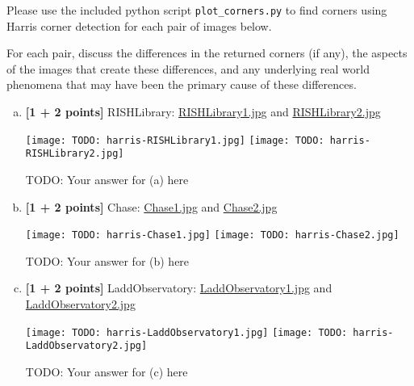 Please use the included python script \texttt{plot\_corners.py} to find corners using Harris corner detection for each pair of images below. 

For each pair, discuss the differences in the returned corners (if any), the aspects of the images that create these differences, and any underlying real world phenomena that may have been the primary cause of these differences.

\begin{enumerate}[(a)]
    \item \textbf{[1 + 2 points]}
RISHLibrary: 
\href{images/RISHLibrary1.jpg}{RISHLibrary1.jpg} and \href{images/RISHLibrary2.jpg}{RISHLibrary2.jpg} 

\texttt{[image: TODO: harris-RISHLibrary1.jpg]}
\texttt{[image: TODO: harris-RISHLibrary2.jpg]}

\begin{mdframed}
    TODO: Your answer for (a) here
\end{mdframed}

    \item \textbf{[1 + 2 points]}
Chase:
\href{images/Chase1.jpg}{Chase1.jpg} and \href{images/Chase2.jpg}{Chase2.jpg}

\texttt{[image: TODO: harris-Chase1.jpg]}
\texttt{[image: TODO: harris-Chase2.jpg]}

\begin{mdframed}
    TODO: Your answer for (b) here
\end{mdframed}

    \item \textbf{[1 + 2 points]} 
LaddObservatory: 
\href{images/LaddObservatory1.jpg}{LaddObservatory1.jpg} and \href{images/LaddObservatory2.jpg}{LaddObservatory2.jpg}

\texttt{[image: TODO: harris-LaddObservatory1.jpg]}
\texttt{[image: TODO: harris-LaddObservatory2.jpg]}

\begin{mdframed}
    TODO: Your answer for (c) here
\end{mdframed}

\end{enumerate}






